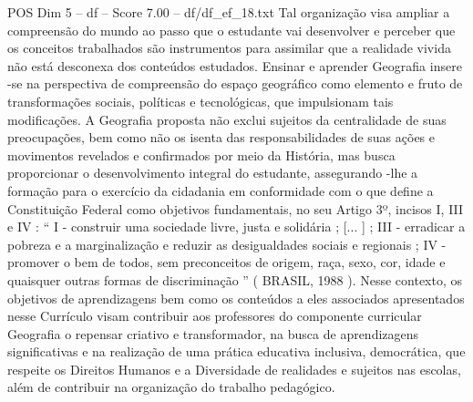 \begin{textsample}{POS Dim 5 – df – Score 7.00 – df/df\_ef\_18.txt}
Tal organização visa ampliar a compreensão do mundo ao passo que o estudante vai desenvolver e perceber que os conceitos trabalhados são instrumentos para assimilar que a realidade vivida não está desconexa dos conteúdos estudados.
Ensinar e aprender Geografia insere -se na perspectiva de compreensão do espaço geográfico como elemento e fruto de transformações sociais, políticas e tecnológicas, que impulsionam tais modificações.
A Geografia proposta não exclui sujeitos da centralidade de suas preocupações, bem como não os isenta das responsabilidades de suas ações e movimentos revelados e confirmados por meio da História, mas busca proporcionar o desenvolvimento integral do estudante, assegurando -lhe a formação para o exercício da cidadania em conformidade com o que define a Constituição Federal como objetivos fundamentais, no seu Artigo 3º, incisos I, III e IV : “ I - construir uma sociedade livre, justa e solidária ; [... ] ; III - erradicar a pobreza e a marginalização e reduzir as desigualdades sociais e regionais ; IV - promover o bem de todos, sem preconceitos de origem, raça, sexo, cor, idade e quaisquer outras formas de discriminação ” ( BRASIL, 1988 ).
Nesse contexto, os objetivos de aprendizagens bem como os conteúdos a eles associados apresentados nesse Currículo visam contribuir aos professores do componente curricular Geografia o repensar criativo e transformador, na busca de aprendizagens significativas e na realização de uma prática educativa inclusiva, democrática, que respeite os Direitos Humanos e a Diversidade de realidades e sujeitos nas escolas, além de contribuir na organização do trabalho pedagógico.

\end{textsample}
